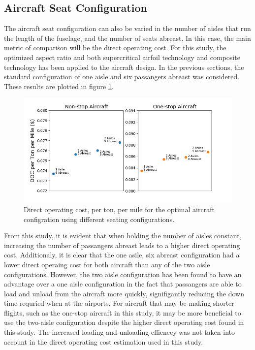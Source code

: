 \documentclass{article}
\begin{document}
    \subsection{Aircraft Seat Configuration}
    \label{sec:seat configuration}
        \begin{flushleft}
            The aircraft seat configuration can also be varied in the number of
            aisles that run the length of the fuselage, and the number of seats
            abreast. In this case, the main metric of comparison will be the
            direct operating cost. For this study, the optimized aspect ratio
            and both supercritical airfoil technology and composite technology
            has been applied to the aircraft design. In the previous sections, the
            standard configuration of one aisle and six passangers abreast
            was considered. These results are plotted in figure \ref{fig:seats}.

            \begin{figure}[ht]
                \centering
                \includegraphics[scale=0.7]{seating.PNG}
                \caption{Direct operating cost, per ton, per mile for the optimal aircraft configration using different seating configurations.}
                \label{fig:seats}
            \end{figure}

            From this study, it is evident that when holding the number of
            aisles constant, increasing the number of passangers abreast leads
            to a higher direct operating cost. Additionaly, it is clear that the
            one asile, six abreast configuration had a lower direct operaing
            cost for both aircraft than any of the two aisle configurations.
            However, the two aisle configuration has been found to have an
            advantage over a one aisle configuration in the fact that passangers
            are able to load and unload from the aircraft more quickly,
            signifigantly reducing the down time requried when at the airports.
            For aircraft that may be making shorter flights, such as the
            one-stop aircraft in this study, it may be more beneficial to use
            the two-aisle configuration despite the higher direct operating cost
            found in this study. The increased loading and unloading efficnecy
            was not taken into account in the direct operating cost estimation
            used in this study.

        \end{flushleft}
\end{document}
